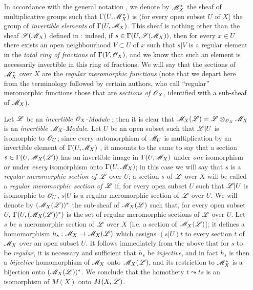 \begin{env}[20.1.8]\label{IV.20.1.8}
In accordance with the general notation , we denote by $\mathscr{M}_X^*$ the sheaf of multiplicative groups such that $\Gamma(U,\mathscr{M}_X^*)$ is (for every open subset $U$ of $X$) the group of \emph{invertible elements} of $\Gamma(U,\mathscr{M}_X)$.
This sheaf is nothing other than the sheaf $\mathscr{S}(\mathscr{M}_X)$ defined in : indeed, if $s\in\Gamma(U,\mathscr{S}(\mathscr{M}_X))$, then for every $x\in U$ there exists an open neighbourhood $V\subset U$ of $x$ such that $s|V$ is a regular element in the \emph{total ring of fractions} of $\Gamma(V,\mathscr{O}_X)$, and we know that such an element is necessarily invertible in this ring of fractions.
We will say that the sections of $\mathscr{M}_X^*$ over $X$ are the \emph{regular meromorphic functions} (note that we depart here from the terminology followed by certain authors, who call ``regular'' meromorphic functions those that are \emph{sections of $\mathscr{O}_X$}, identified with a sub-sheaf of $\mathscr{M}_X$).

Let $\mathscr{L}$ be an \emph{invertible} $\mathscr{O}_X$-\emph{Module} ; then it is clear that $\mathscr{M}_X(\mathscr{L})=\mathscr{L}\otimes_{\mathscr{O}_X}\mathscr{M}_X$
is an \emph{invertible} $\mathscr{M}_X$-\emph{Module}.
Let $U$ be an open subset such that $\mathscr{L}|U$ is isomorphic to $\mathscr{O}_U$; since every automorphism of $\mathscr{M}_U$ is multiplication by an invertible element of $\Gamma(U,\mathscr{M}_X)$ , it amounts to the same to say that a section $s\in\Gamma(U,\mathscr{M}_X(\mathscr{L}))$ has an invertible image in $\Gamma(U,\mathscr{M}_X)$ under \emph{one} isomorphism or under \emph{every} isomorphism onto $\Gamma(U,\mathscr{M}_X)$; in this case we will say that $s$ is a \emph{regular meromorphic section of $\mathscr{L}$} over $U$; a section $s$ of $\mathscr{L}$ over $X$ will be called a \emph{regular meromorphic section of $\mathscr{L}$} if, for every open subset $U$ such that $\mathscr{L}|U$ is isomorphic to $\mathscr{O}_U$, $s|U$ is a regular meromorphic section of $\mathscr{L}$ over $U$.
We will denote by $(\mathscr{M}_X(\mathscr{L}))^*$ the sub-sheaf of $\mathscr{M}_X(\mathscr{L})$ such that, for every open subset $U$, $\Gamma(U,(\mathscr{M}_X(\mathscr{L}))^*)$ is the set of regular meromorphic sections of $\mathscr{L}$ over $U$.
Let $s$ be a meromorphic section of $\mathscr{L}$ over $X$ (i.e. a section of $\mathscr{M}_X(\mathscr{L})$); it defines a homomorphism $h_s:\mathscr{M}_X\to\mathscr{M}_X(\mathscr{L})$ which assigns $(s|U)t$ to every section $t$ of $\mathscr{M}_X$ over an open subset $U$.
It follows immediately from the above that for $s$ to be \emph{regular}, it is necessary and sufficient that $h_s$ be \emph{injective}, and in fact $h_s$ is then a \emph{bijective} homomorphism of $\mathscr{M}_X$ onto $\mathscr{M}_X(\mathscr{L})$, and its restriction to $\mathscr{M}_X^*$ is a bijection onto $(\mathscr{M}_X(\mathscr{L}))^*$.
We conclude that the homothety $t\leadsto ts$ is an isomorphism of $M(X)$ onto $M(X,\mathscr{L})$.
\end{env}


